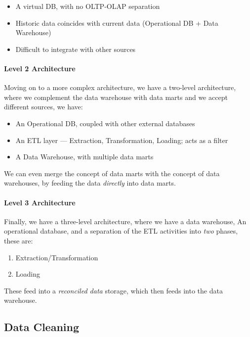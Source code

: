 \documentclass[openright, twoside, twocolumn, a4paper, 10pt]{report}
\begin{document}
\begin{itemize}
	\item A virtual DB, with no OLTP-OLAP separation
	\item Historic data coincides with current data (Operational DB + Data Warehouse)
	\item Difficult to integrate with other sources
\end{itemize}

\paragraph{Level 2 Architecture}

Moving on to a more complex architecture, we have a two-level architecture,
where we complement the data warehouse with data marts and we accept
different sources, we have:

\begin{itemize}
	\item An Operational DB, coupled with other external databases
	\item An ETL layer --- Extraction, Transformation, Loading; acts as a filter
	\item A Data Warehouse, with multiple data marts
\end{itemize}

We can even merge the concept of data marts with the concept of data warehouses,
by feeding the data \emph{directly} into data marts.

\paragraph{Level 3 Architecture}

Finally, we have a three-level architecture, where we have a data warehouse,
An operational database, and a separation of the ETL activities into
\emph{two} phases, these are:

\begin{enumerate}
	\item Extraction/Transformation
	\item Loading
\end{enumerate}

These feed into a \emph{reconciled data} storage, which then feeds into
the data warehouse.

\subsection{Data Cleaning}
\end{document}
